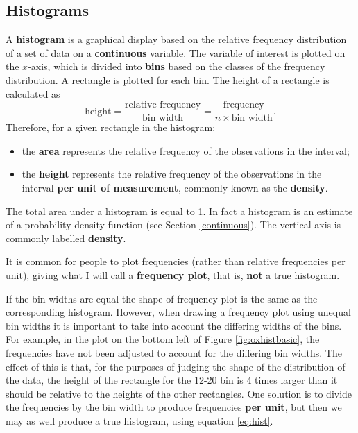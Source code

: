 \documentclass[
  british,
  11pt,
  openany, a4paper]{book}
\providecommand{\tightlist}{%
  \setlength{\itemsep}{0pt}\setlength{\parskip}{0pt}}
\begin{document}
\subsection{Histograms}\label{histogram}

A \textbf{histogram} is a graphical display based on the relative frequency distribution of a set of data on a \textbf{continuous} variable. The variable of interest is plotted on the \(x\)-axis, which is divided into \textbf{bins} based on the classes of the frequency distribution. A rectangle is plotted for each bin. The height of a rectangle is calculated as
\begin{equation}
\text{height} = \frac{\text{relative frequency}}{\text{bin width}} = \frac{\text{frequency}}{n \times \text{bin width}}.
\label{eq:hist}
\end{equation}
Therefore, for a given rectangle in the histogram:

\begin{itemize}
\tightlist
\item
  the \textbf{area} represents the relative frequency of the observations in
  the interval;
\item
  the \textbf{height} represents the relative frequency of the observations in
  the interval \textbf{per unit of measurement}, commonly known as the \textbf{density}.
\end{itemize}

The total area under a histogram is equal to 1. In fact a histogram is an estimate of a probability density function (see Section \ref{continuous}). The vertical axis is commonly labelled \textbf{density}.

It is common for people to plot frequencies (rather than relative frequencies per unit), giving what I will call a \textbf{frequency plot}, that is, \textbf{not} a true histogram.

If the bin widths are equal the shape of frequency plot is the same as the corresponding histogram. However, when drawing a frequency plot using unequal bin widths it is important to take into account the differing widths of the bins. For example, in the plot on the bottom left of Figure \ref{fig:oxhistbasic}, the frequencies have not been adjusted to account for the differing bin widths. The effect of this is that, for the purposes of judging the shape of the distribution of the data, the height of the rectangle for the 12-20 bin is 4 times larger than it should be relative to the heights of the other rectangles. One solution is to divide the frequencies by the bin width to produce frequencies \textbf{per unit}, but then we may as well produce a true histogram, using equation \eqref{eq:hist}.
\end{document}
